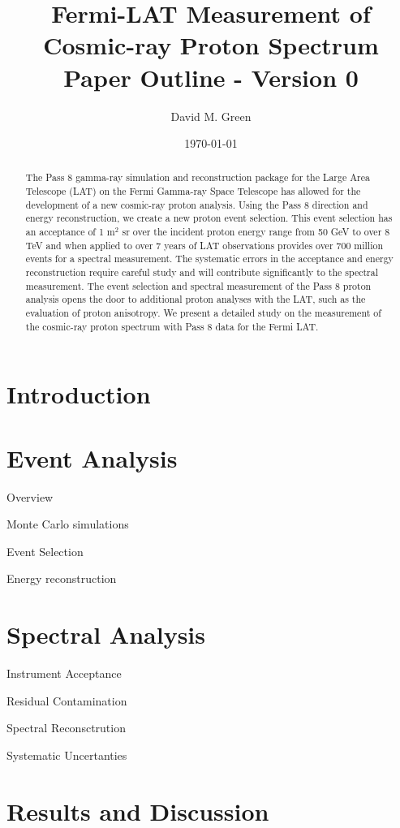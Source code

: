\documentclass{article}
\begin{document}
 
\author{David M. Green}
\title{Fermi-LAT Measurement of Cosmic-ray Proton Spectrum \\ Paper Outline - Version 0}
\date{\today}

\maketitle

\begin{abstract}
The Pass 8 gamma-ray simulation and reconstruction package for the Large Area Telescope (LAT) on the Fermi Gamma-ray Space Telescope has allowed for the development of a new cosmic-ray proton analysis. 
Using the Pass 8 direction and energy reconstruction, we create a new proton event selection. 
This event selection has an acceptance of 1 m$^2$ sr over the incident proton energy range from 50 GeV to over 8 TeV and when applied to over 7 years of LAT observations provides over 700 million events for a spectral measurement. 
The systematic errors in the acceptance and energy reconstruction require careful study and will contribute significantly to the spectral measurement. 
The event selection and spectral measurement of the Pass 8 proton analysis opens the door to additional proton analyses with the LAT, such as the evaluation of proton anisotropy. 
We present a detailed study on the measurement of the cosmic-ray proton spectrum with Pass 8 data for the Fermi LAT.
\end{abstract}

\section{Introduction}
	\begin{myEnumerate}
		\item 
	\end{myEnumerate}

\section{Event Analysis}
	\begin{myEnumerate}
		\item Overview
		\item Monte Carlo simulations
		\item Event Selection
		\item Energy reconstruction
	\end{myEnumerate}

\section{Spectral Analysis}
	\begin{myEnumerate}
		\item Instrument Acceptance
		\item Residual Contamination
		\item Spectral Reconsctrution
		\item Systematic Uncertanties
	\end{myEnumerate}
\section{Results and Discussion}
\end{document}
